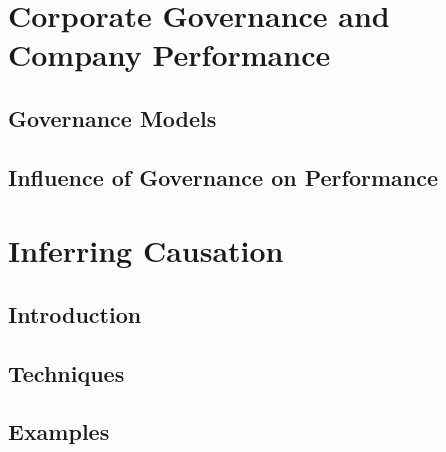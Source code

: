 \section{Corporate Governance and Company Performance}
\subsection{Governance Models}
\subsection{Influence of Governance on Performance}
\section{Inferring Causation}
\subsection{Introduction}
\subsection{Techniques}
\subsection{Examples}